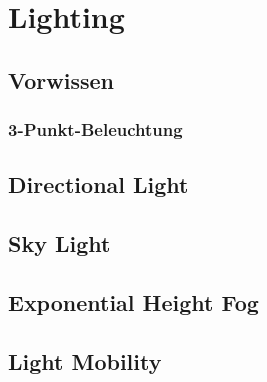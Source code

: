 \section{Lighting}
\subsection{Vorwissen}
\subsubsection{3-Punkt-Beleuchtung}
\subsection{Directional Light}
\subsection{Sky Light}
\subsection{Exponential Height Fog}
\subsection{Light Mobility}
